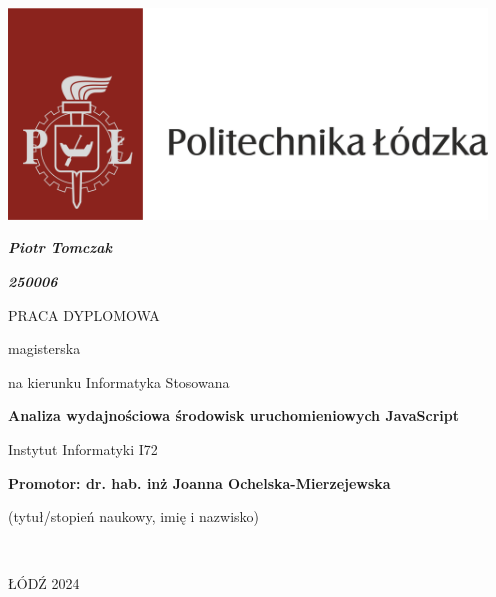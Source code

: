 \thispagestyle{empty}

\includegraphics[width=5in]{LogoPL.png}

\begin{centering}

\vspace{1cm}

\textbf{\textit{\large{Piotr Tomczak}}}

\vspace{.1cm}

\textbf{\textit{\large{250006}}}

\vspace{1.5cm}

{\large{PRACA DYPLOMOWA}}

\vspace{.1cm}

{\large{magisterska}}

\vspace{.1cm}
na kierunku Informatyka Stosowana
\vspace{1.8cm}

\textbf{\Large{Analiza wydajnościowa środowisk uruchomieniowych JavaScript}}

\end{centering}

\vspace{3.0cm}
\begin{centering}
{Instytut Informatyki I72}\\
\end{centering}
\vspace{1.0cm}
\textbf{Promotor: dr. hab. inż Joanna Ochelska-Mierzejewska}

\begin{centering}
(tytuł/stopień naukowy, imię i nazwisko)

~\\
\end{centering}
\vfill
\begin{centering}
ŁÓDŹ 2024\\
\end{centering}
